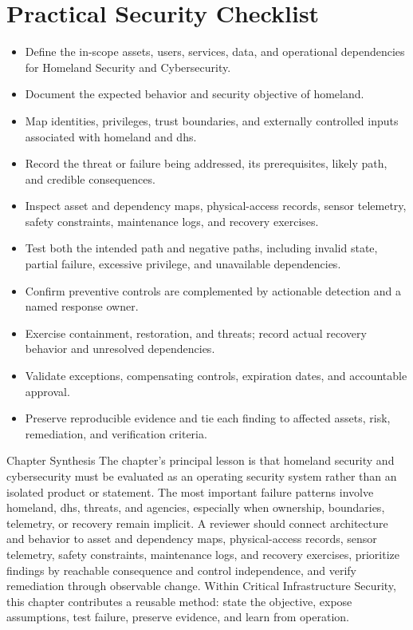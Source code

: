 \documentclass[11pt,letterpaper]{article}
\begin{document}
\section*{Practical Security Checklist}
\begin{itemize}[label=$\square$]
\item Define the in-scope assets, users, services, data, and operational dependencies for Homeland Security and Cybersecurity.
\item Document the expected behavior and security objective of homeland.
\item Map identities, privileges, trust boundaries, and externally controlled inputs associated with homeland and dhs.
\item Record the threat or failure being addressed, its prerequisites, likely path, and credible consequences.
\item Inspect asset and dependency maps, physical-access records, sensor telemetry, safety constraints, maintenance logs, and recovery exercises.
\item Test both the intended path and negative paths, including invalid state, partial failure, excessive privilege, and unavailable dependencies.
\item Confirm preventive controls are complemented by actionable detection and a named response owner.
\item Exercise containment, restoration, and threats; record actual recovery behavior and unresolved dependencies.
\item Validate exceptions, compensating controls, expiration dates, and accountable approval.
\item Preserve reproducible evidence and tie each finding to affected assets, risk, remediation, and verification criteria.
\end{itemize}
\begin{CornellSummaryBox}{Chapter Synthesis}
The chapter's principal lesson is that homeland security and cybersecurity must be evaluated as an operating security system rather than an isolated product or statement. The most important failure patterns involve homeland, dhs, threats, and agencies, especially when ownership, boundaries, telemetry, or recovery remain implicit. A reviewer should connect architecture and behavior to asset and dependency maps, physical-access records, sensor telemetry, safety constraints, maintenance logs, and recovery exercises, prioritize findings by reachable consequence and control independence, and verify remediation through observable change. Within Critical Infrastructure Security, this chapter contributes a reusable method: state the objective, expose assumptions, test failure, preserve evidence, and learn from operation.
\end{CornellSummaryBox}
\end{document}

